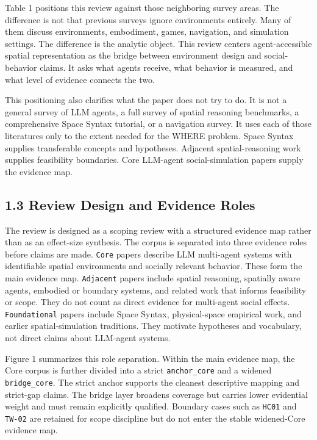\documentclass[
  twocolumn]{article}
\begin{document}
Table 1 positions this review against those neighboring survey areas.
The difference is not that previous surveys ignore environments
entirely. Many of them discuss environments, embodiment, games,
navigation, and simulation settings. The difference is the analytic
object. This review centers agent-accessible spatial representation as
the bridge between environment design and social-behavior claims. It
asks what agents receive, what behavior is measured, and what level of
evidence connects the two.

This positioning also clarifies what the paper does not try to do. It is
not a general survey of LLM agents, a full survey of spatial reasoning
benchmarks, a comprehensive Space Syntax tutorial, or a navigation
survey. It uses each of those literatures only to the extent needed for
the WHERE problem. Space Syntax supplies transferable concepts and
hypotheses. Adjacent spatial-reasoning work supplies feasibility
boundaries. Core LLM-agent social-simulation papers supply the evidence
map.

\subsection{1.3 Review Design and Evidence
Roles}\label{review-design-and-evidence-roles}

The review is designed as a scoping review with a structured evidence
map rather than as an effect-size synthesis. The corpus is separated
into three evidence roles before claims are made. \texttt{Core} papers
describe LLM multi-agent systems with identifiable spatial environments
and socially relevant behavior. These form the main evidence map.
\texttt{Adjacent} papers include spatial reasoning, spatially aware
agents, embodied or boundary systems, and related work that informs
feasibility or scope. They do not count as direct evidence for
multi-agent social effects. \texttt{Foundational} papers include Space
Syntax, physical-space empirical work, and earlier spatial-simulation
traditions. They motivate hypotheses and vocabulary, not direct claims
about LLM-agent systems.

Figure 1 summarizes this role separation. Within the main evidence map,
the Core corpus is further divided into a strict \texttt{anchor\_core}
and a widened \texttt{bridge\_core}. The strict anchor supports the
cleanest descriptive mapping and strict-gap claims. The bridge layer
broadens coverage but carries lower evidential weight and must remain
explicitly qualified. Boundary cases such as \texttt{HC01} and
\texttt{TW-02} are retained for scope discipline but do not enter the
stable widened-Core evidence map.
\end{document}
